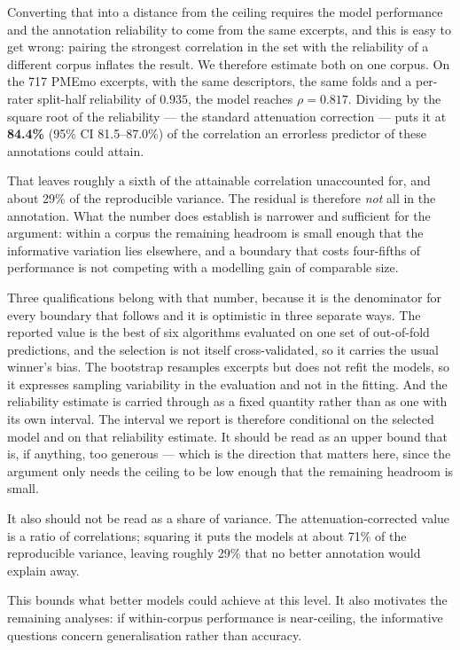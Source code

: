 Converting that into a distance from the ceiling requires the model performance and
the annotation reliability to come from the same excerpts, and this is easy to get
wrong: pairing the strongest correlation in the set with the reliability of a
different corpus inflates the result. We therefore estimate both on one corpus.
On the 717 PMEmo excerpts, with the same descriptors, the same folds and a
per-rater split-half reliability of $0.935$, the model reaches $\rho = 0.817$.
Dividing by the square root of the reliability --- the standard attenuation
correction --- puts it at \textbf{84.4\%} (95\% CI 81.5--87.0\%) of the correlation
an errorless predictor of these annotations could attain.

That leaves roughly a sixth of the attainable correlation unaccounted for, and
about 29\% of the reproducible variance. The residual is therefore \emph{not} all
in the annotation. What the number does establish is narrower and sufficient for
the argument: within a corpus the remaining headroom is small enough that the
informative variation lies elsewhere, and a boundary that costs four-fifths of
performance is not competing with a modelling gain of comparable size.

Three qualifications belong with that number, because it is the denominator for
every boundary that follows and it is optimistic in three separate ways. The
reported value is the best of six algorithms evaluated on one set of out-of-fold
predictions, and the selection is not itself cross-validated, so it carries the
usual winner's bias. The bootstrap resamples excerpts but does not refit the
models, so it expresses sampling variability in the evaluation and not in the
fitting. And the reliability estimate is carried through as a fixed quantity
rather than as one with its own interval. The interval we report is therefore
conditional on the selected model and on that reliability estimate. It should be
read as an upper bound that is, if anything, too generous --- which is the
direction that matters here, since the argument only needs the ceiling to be low
enough that the remaining headroom is small.

It also should not be read as a share of variance. The attenuation-corrected value
is a ratio of correlations; squaring it puts the models at about 71\% of the
reproducible variance, leaving roughly 29\% that no better annotation would
explain away.

This bounds what better models could achieve at this level. It also motivates the
remaining analyses: if within-corpus performance is near-ceiling, the informative
questions concern generalisation rather than accuracy.

